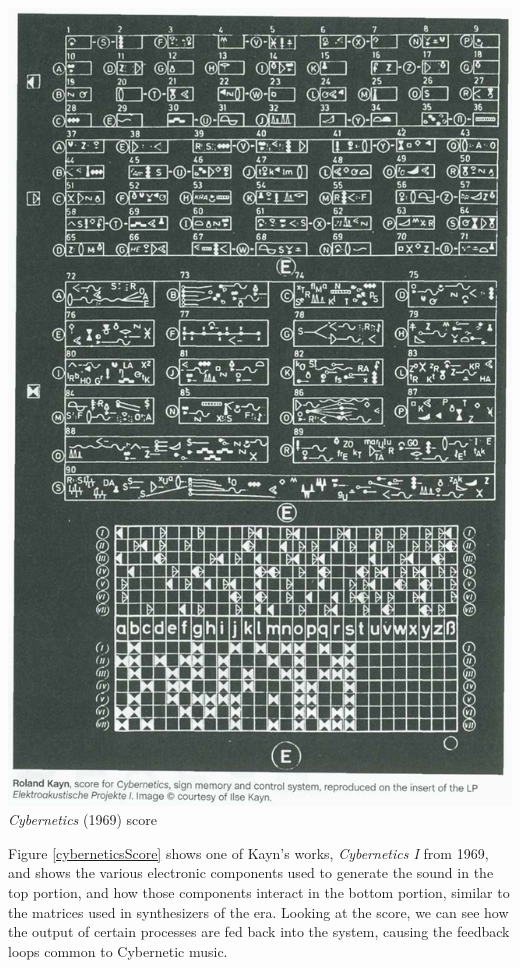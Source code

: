 \vspace{10mm}
\begin{center}
\includegraphics[scale=0.3]{diagrams/kayn_cybernetics.jpeg}
\label{cyberneticsScore}\\
\caption{\textit{Cybernetics} (1969) score}
\end{center}

Figure \ref{cyberneticsScore} shows one of Kayn's works, \textit{Cybernetics I} from 1969, and shows the various electronic components used to generate the sound in the top portion, and how those components interact in the bottom portion, similar to the matrices used in synthesizers of the era. Looking at the score, we can see how the output of certain processes are fed back into the system, causing the feedback loops common to Cybernetic music.


